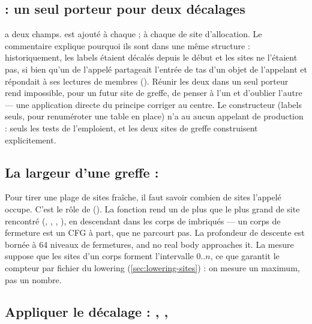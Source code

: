 \subsection{\texorpdfstring{}{Offsets} : un seul porteur pour deux décalages}


 a deux champs.  est ajouté à chaque  ;  à chaque  de site d'allocation. Le commentaire explique pourquoi ils sont dans une même structure : historiquement, les labels étaient décalés depuis le début et les sites ne l'étaient pas, si bien qu'un  de l'appelé partageait l'entrée de tas d'un objet de l'appelant et répondait à ses lectures de membres (). Réunir les deux dans un seul porteur rend impossible, pour un futur site de greffe, de penser à l'un et d'oublier l'autre --- une application directe du principe \og corriger au centre\fg{}. Le constructeur  (labels seuls, pour renuméroter une table en place) n'a au \snapshotCommit{} aucun appelant de production : seuls les tests de  l'emploient, et les deux sites de greffe construisent  explicitement.

\subsection{La largeur d'une greffe : \texorpdfstring{}{alloc\_id\_span}}

Pour tirer une plage de sites fraîche, il faut savoir combien de sites l'appelé occupe. C'est le rôle de  (). La fonction rend un de plus que le plus grand  de site rencontré (, , , ), en descendant dans les corps de  imbriqués --- un corps de fermeture est un CFG à part, que  ne parcourt pas. La profondeur de descente est bornée à 64 niveaux de fermetures, \og and no real body approaches it\fg{}. La mesure suppose que les sites d'un corps forment l'intervalle $0..n$, ce que garantit le compteur par fichier du lowering (\cref{sec:lowering-sites}) : on mesure un maximum, pas un nombre.

\subsection{Appliquer le décalage : \texorpdfstring{}{remap\_expr}, \texorpdfstring{}{remap\_cfg}, \texorpdfstring{}{remap\_hooks}}

